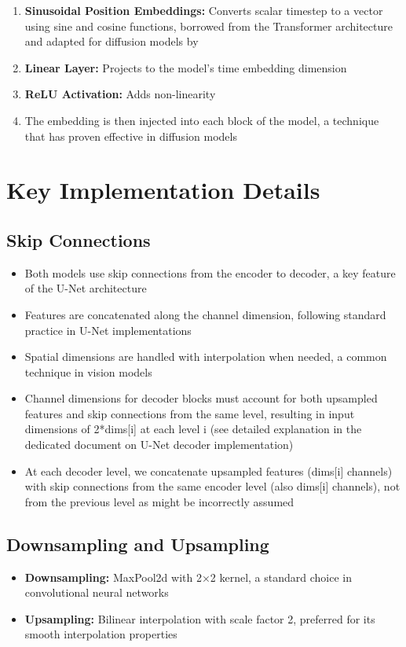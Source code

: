 \documentclass{article}
\begin{document}
\begin{enumerate}
  \item \textbf{Sinusoidal Position Embeddings:} Converts scalar timestep to a vector using sine and cosine functions, borrowed from the Transformer architecture \citep{vaswani2017attention} and adapted for diffusion models by \citet{ho2020denoising}
  \item \textbf{Linear Layer:} Projects to the model's time embedding dimension
  \item \textbf{ReLU Activation:} Adds non-linearity
  \item The embedding is then injected into each block of the model, a technique that has proven effective in diffusion models \citep{nichol2021improved}
\end{enumerate}

\section{Key Implementation Details}

\subsection{Skip Connections}
\begin{itemize}
  \item Both models use skip connections from the encoder to decoder, a key feature of the U-Net architecture \citep{ronneberger2015unet}
  \item Features are concatenated along the channel dimension, following standard practice in U-Net implementations \citep{ho2020denoising}
  \item Spatial dimensions are handled with interpolation when needed, a common technique in vision models \citep{odena2016deconvolution}
  \item Channel dimensions for decoder blocks must account for both upsampled features and skip connections from the same level, resulting in input dimensions of 2*dims[i] at each level i (see detailed explanation in the dedicated document on U-Net decoder implementation)
  \item At each decoder level, we concatenate upsampled features (dims[i] channels) with skip connections from the same encoder level (also dims[i] channels), not from the previous level as might be incorrectly assumed
\end{itemize}

\subsection{Downsampling and Upsampling}
\begin{itemize}
  \item \textbf{Downsampling:} MaxPool2d with 2×2 kernel, a standard choice in convolutional neural networks \citep{krizhevsky2012imagenet}
  \item \textbf{Upsampling:} Bilinear interpolation with scale factor 2, preferred for its smooth interpolation properties \citep{odena2016deconvolution}
\end{itemize}
\end{document}
